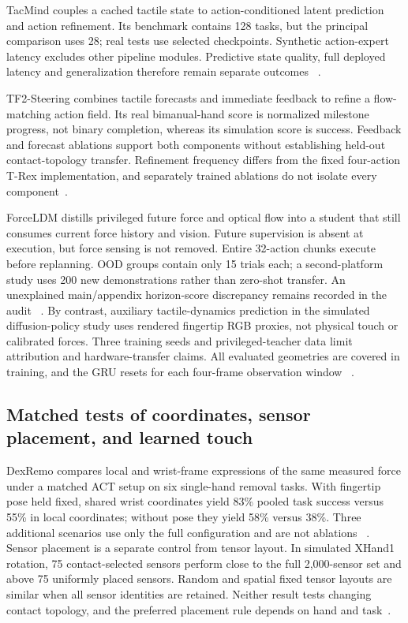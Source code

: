 TacMind couples a cached tactile state to action-conditioned latent prediction
and action refinement. Its benchmark contains 128 tasks, but the principal
comparison uses 28; real tests use selected checkpoints. Synthetic action-expert
latency excludes other pipeline modules. Predictive state quality, full deployed
latency and generalization therefore remain separate outcomes
~\cite{nov2026tacmind}.

TF2-Steering combines tactile forecasts and immediate feedback to refine a
flow-matching action field. Its real bimanual-hand score is normalized milestone
progress, not binary completion, whereas its simulation score is success.
Feedback and forecast ablations support both components without establishing
held-out contact-topology transfer. Refinement frequency differs from the fixed
four-action T-Rex implementation, and separately trained ablations do not isolate
every component~\cite{nov2026tf2steering}.

ForceLDM distills privileged future force and optical flow into a student that
still consumes current force history and vision. Future supervision is absent
at execution, but force sensing is not removed. Entire 32-action chunks execute
before replanning. OOD groups contain only 15 trials each; a second-platform
study uses 200 new demonstrations rather than zero-shot transfer. An unexplained
main/appendix horizon-score discrepancy remains recorded in the audit
~\cite{nov2026forceldm}. By contrast, auxiliary tactile-dynamics
prediction in the simulated diffusion-policy study uses rendered fingertip RGB
proxies, not physical touch or calibrated forces. Three training seeds and
privileged-teacher data limit attribution and hardware-transfer claims. All evaluated geometries are covered in training,
and the GRU resets for each four-frame observation window
~\cite{nov2026auxiliarytactiledynamics}.

\subsection{Matched tests of coordinates, sensor placement, and learned touch}

DexRemo compares local and wrist-frame expressions of the same measured force
under a matched ACT setup on six single-hand removal tasks. With fingertip pose
held fixed, shared wrist coordinates yield 83\% pooled task success versus
55\% in local coordinates; without pose they yield 58\% versus 38\%. Three
additional scenarios use only the full configuration and are not ablations
~\cite{nov18dexremo}. Sensor placement is a separate control from tensor layout. In simulated XHand1 rotation, 75 contact-selected sensors
perform close to the full 2,000-sensor set and above 75 uniformly placed sensors.
Random and spatial fixed tensor layouts are similar when all sensor identities
are retained. Neither result tests changing contact topology, and the preferred
placement rule depends on hand and task~\cite{nov18whichtaxels}.

